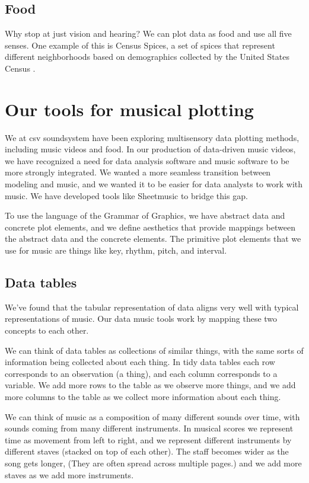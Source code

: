 \documentclass{acm_proc_article-sp}
\begin{document}
\subsection{Food}
Why stop at just vision and hearing? We can plot data as food and use
all five senses. One example of this is Census Spices, a set of spices
that represent different neighborhoods based on demographics collected
by the United States Census \cite{censusspices}.

\section{Our tools for musical plotting}
We at csv soundsystem have been exploring multisensory
data plotting methods, including music videos and food.
In our production of data-driven music videos, we have recognized a need
for data analysis software and music software to be more strongly integrated.
We wanted a more seamless transition between modeling and music, and we
wanted it to be easier for data analysts to work with music. We have
developed tools like Sheetmusic to bridge this gap.

To use the language of the Grammar of Graphics, \cite{grammar}
we have abstract data and concrete plot elements,
and we define aesthetics that provide mappings
between the abstract data and the concrete elements.
The primitive plot elements that we use for music are things
like key, rhythm, pitch, and interval.

\subsection{Data tables}
We've found that the tabular representation of data aligns very well with
typical representations of music. Our data music tools work by mapping these
two concepts to each other.

We can think of data tables as collections of similar things, with the
same sorts of information being collected about each thing. In tidy data
tables \cite{tidydata} each row corresponds to an observation (a thing),
and each column corresponds to a variable. We add more rows to the table
as we observe more things, and we add more columns to the table as we
collect more information about each thing.

We can think of music as a composition of many different sounds over time,
with sounds coming from many different instruments. In musical scores
we represent time as movement from left to right, and we represent different
instruments by different staves (stacked on top of each other).
The staff becomes wider as the song gets longer, (They are often spread
across multiple pages.) and we add more staves as we add more instruments.
\end{document}
